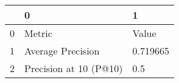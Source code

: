 \begin{tabular}{lll}
\toprule
{} &                       0 &         1 \\
\midrule
0 &                  Metric &     Value \\
1 &       Average Precision &  0.719665 \\
2 &  Precision at 10 (P@10) &       0.5 \\
\bottomrule
\end{tabular}
